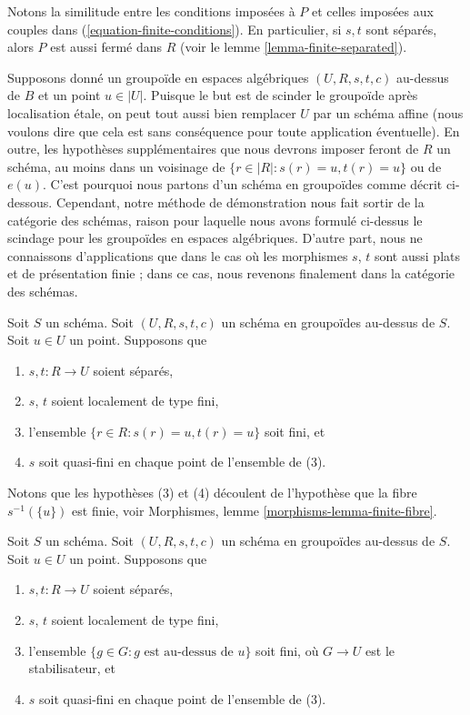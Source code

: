 \noindent
Notons la similitude entre les conditions imposées à $P$ et celles imposées
aux couples dans (\ref{equation-finite-conditions}). En particulier, si
$s, t$ sont séparés, alors $P$ est aussi fermé dans $R$ (voir le
lemme \ref{lemma-finite-separated}).

\medskip\noindent
Supposons donné un groupoïde en espaces algébriques
$(U, R, s, t, c)$ au-dessus de $B$ et un point $u \in |U|$.
Puisque le but est de scinder le groupoïde après localisation \'etale,
on peut tout aussi bien remplacer $U$ par un schéma affine (nous voulons dire
que cela est sans conséquence pour toute application éventuelle).
En outre, les hypothèses supplémentaires que nous devrons
imposer feront de $R$ un schéma, au moins dans un voisinage
de $\{r \in |R| : s(r) = u, t(r) = u\}$ ou de $e(u)$. C'est pourquoi
nous partons d'un schéma en groupoïdes comme décrit ci-dessous.
Cependant, notre méthode de démonstration nous fait sortir de la catégorie
des schémas, raison pour laquelle nous avons formulé ci-dessus le scindage
pour les groupoïdes en espaces algébriques.
D'autre part, nous ne connaissons d'applications que
dans le cas où les morphismes $s$, $t$
sont aussi plats et de présentation finie ; dans ce cas,
nous revenons finalement dans la catégorie des schémas.

\begin{situation}
\label{situation-strong-splitting}
Soit $S$ un schéma.
Soit $(U, R, s, t, c)$ un schéma en groupoïdes au-dessus de $S$.
Soit $u \in U$ un point. Supposons que
\begin{enumerate}
\item $s, t : R \to U$ soient séparés,
\item $s$, $t$ soient localement de type fini,
\item l'ensemble $\{r \in R : s(r) = u, t(r) = u\}$ soit fini, et
\item $s$ soit quasi-fini en chaque point de l'ensemble de (3).
\end{enumerate}
Notons que les hypothèses (3) et (4) découlent de l'hypothèse
que la fibre $s^{-1}(\{u\})$ est finie, voir
Morphismes, lemme \ref{morphisms-lemma-finite-fibre}.
\end{situation}

\begin{situation}[Scindage]
\label{situation-splitting}
Soit $S$ un schéma.
Soit $(U, R, s, t, c)$ un schéma en groupoïdes au-dessus de $S$.
Soit $u \in U$ un point. Supposons que
\begin{enumerate}
\item $s, t : R \to U$ soient séparés,
\item $s$, $t$ soient localement de type fini,
\item l'ensemble $\{g \in G : g\text{ est au-dessus de }u\}$ soit fini, où $G \to U$
est le stabilisateur, et
\item $s$ soit quasi-fini en chaque point de l'ensemble de (3).
\end{enumerate}
\end{situation}

